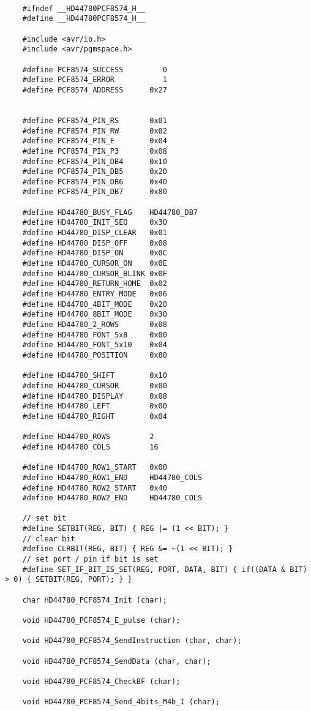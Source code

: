 \begin{lstlisting}
	
	#ifndef __HD44780PCF8574_H__
	#define __HD44780PCF8574_H__
	
	#include <avr/io.h>
	#include <avr/pgmspace.h>
	
	#define PCF8574_SUCCESS         0
	#define PCF8574_ERROR           1
	#define PCF8574_ADDRESS      0x27
	
	
	#define PCF8574_PIN_RS       0x01
	#define PCF8574_PIN_RW       0x02
	#define PCF8574_PIN_E        0x04
	#define PCF8574_PIN_P3       0x08
	#define PCF8574_PIN_DB4      0x10
	#define PCF8574_PIN_DB5      0x20
	#define PCF8574_PIN_DB6      0x40
	#define PCF8574_PIN_DB7      0x80
	
	#define HD44780_BUSY_FLAG    HD44780_DB7
	#define HD44780_INIT_SEQ     0x30
	#define HD44780_DISP_CLEAR   0x01
	#define HD44780_DISP_OFF     0x08
	#define HD44780_DISP_ON      0x0C
	#define HD44780_CURSOR_ON    0x0E
	#define HD44780_CURSOR_BLINK 0x0F
	#define HD44780_RETURN_HOME  0x02 
	#define HD44780_ENTRY_MODE   0x06
	#define HD44780_4BIT_MODE    0x20
	#define HD44780_8BIT_MODE    0x30
	#define HD44780_2_ROWS       0x08
	#define HD44780_FONT_5x8     0x00
	#define HD44780_FONT_5x10    0x04
	#define HD44780_POSITION     0x80
	
	#define HD44780_SHIFT        0x10
	#define HD44780_CURSOR       0x00
	#define HD44780_DISPLAY      0x08
	#define HD44780_LEFT         0x00
	#define HD44780_RIGHT        0x04
	
	#define HD44780_ROWS         2
	#define HD44780_COLS         16
	
	#define HD44780_ROW1_START   0x00
	#define HD44780_ROW1_END     HD44780_COLS
	#define HD44780_ROW2_START   0x40
	#define HD44780_ROW2_END     HD44780_COLS
	
	// set bit
	#define SETBIT(REG, BIT) { REG |= (1 << BIT); }
	// clear bit
	#define CLRBIT(REG, BIT) { REG &= ~(1 << BIT); }
	// set port / pin if bit is set
	#define SET_IF_BIT_IS_SET(REG, PORT, DATA, BIT) { if((DATA & BIT) > 0) { SETBIT(REG, PORT); } }
	
	char HD44780_PCF8574_Init (char);
	
	void HD44780_PCF8574_E_pulse (char);
	
	void HD44780_PCF8574_SendInstruction (char, char);
	
	void HD44780_PCF8574_SendData (char, char);
	
	void HD44780_PCF8574_CheckBF (char);
	
	void HD44780_PCF8574_Send_4bits_M4b_I (char);
	

\end{lstlisting}

